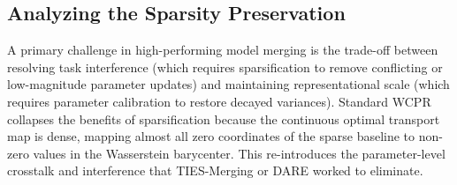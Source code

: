 \documentclass{article}
\theoremstyle{plain}
\theoremstyle{definition}
\theoremstyle{remark}
\begin{document}
\begin{table}[t]
\centering
\caption{Model merging performance on MLP (no BatchNorm) across MNIST, Fashion-MNIST, and CIFAR-10. Average multi-task accuracy is reported.}
\label{tab:mlp}
\end{table}

\subsection{Analyzing the Sparsity Preservation}
A primary challenge in high-performing model merging is the trade-off between resolving task interference (which requires sparsification to remove conflicting or low-magnitude parameter updates) and maintaining representational scale (which requires parameter calibration to restore decayed variances). Standard WCPR \cite{theorist2026wcpr} collapses the benefits of sparsification because the continuous optimal transport map is dense, mapping almost all zero coordinates of the sparse baseline to non-zero values in the Wasserstein barycenter. This re-introduces the parameter-level crosstalk and interference that TIES-Merging \cite{yadav2023ties} or DARE \cite{tokuda2024dare} worked to eliminate.
\end{document}
